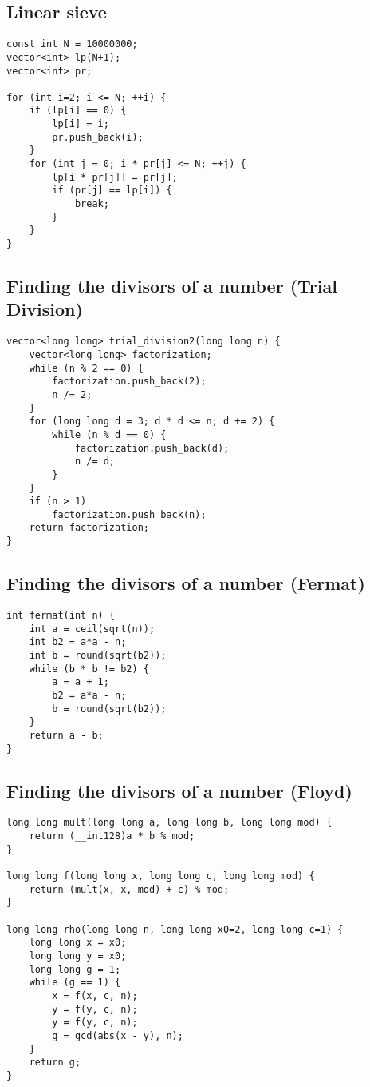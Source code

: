 \documentclass{article}
\begin{document}
\subsection{Linear sieve}
\begin{lstlisting}
const int N = 10000000;
vector<int> lp(N+1);
vector<int> pr;

for (int i=2; i <= N; ++i) {
    if (lp[i] == 0) {
        lp[i] = i;
        pr.push_back(i);
    }
    for (int j = 0; i * pr[j] <= N; ++j) {
        lp[i * pr[j]] = pr[j];
        if (pr[j] == lp[i]) {
            break;
        }
    }
}
\end{lstlisting}
\subsection{Finding the divisors of a number (Trial Division)}

\begin{lstlisting}
vector<long long> trial_division2(long long n) {
    vector<long long> factorization;
    while (n % 2 == 0) {
        factorization.push_back(2);
        n /= 2;
    }
    for (long long d = 3; d * d <= n; d += 2) {
        while (n % d == 0) {
            factorization.push_back(d);
            n /= d;
        }
    }
    if (n > 1)
        factorization.push_back(n);
    return factorization;
}
\end{lstlisting}
\subsection{Finding the divisors of a number (Fermat)}
\begin{lstlisting}
int fermat(int n) {
    int a = ceil(sqrt(n));
    int b2 = a*a - n;
    int b = round(sqrt(b2));
    while (b * b != b2) {
        a = a + 1;
        b2 = a*a - n;
        b = round(sqrt(b2));
    }
    return a - b;
}
\end{lstlisting}
\subsection{Finding the divisors of a number (Floyd)}
\begin{lstlisting}
long long mult(long long a, long long b, long long mod) {
    return (__int128)a * b % mod;
}

long long f(long long x, long long c, long long mod) {
    return (mult(x, x, mod) + c) % mod;
}

long long rho(long long n, long long x0=2, long long c=1) {
    long long x = x0;
    long long y = x0;
    long long g = 1;
    while (g == 1) {
        x = f(x, c, n);
        y = f(y, c, n);
        y = f(y, c, n);
        g = gcd(abs(x - y), n);
    }
    return g;
}

\end{lstlisting}
\end{document}
